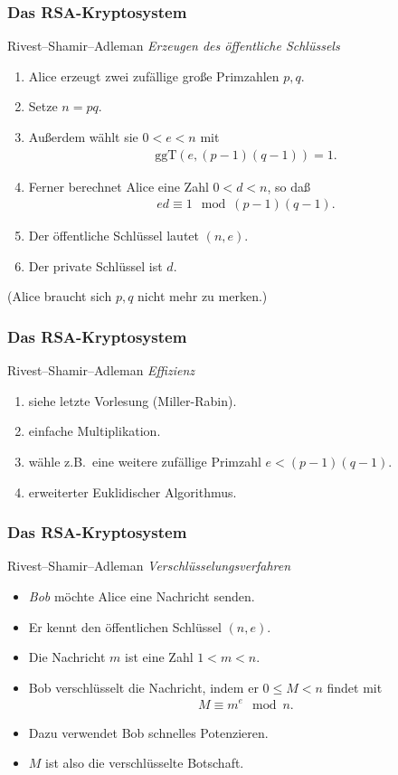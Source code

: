 \documentclass{beamer}
\renewcommand{\emph}[1]{{\textcolor{solarizedRed}{\itshape #1}}}
\newcommand{\ggt}{\mathrm{ggT}}
\renewcommand{\ae}{\"a}
\renewcommand{\oe}{\"o}
\newcommand{\ue}{\"u}
\newcommand{\mytitle}{Das RSA-Kryptosystem}
\begin{document}
\begin{frame}\frametitle{\mytitle}
	\begin{block}{Rivest--Shamir--Adleman}
		{\itshape Erzeugen des \oe ffentliche Schl\ue ssels}
		\begin{enumerate}
			\item \alert{Alice} erzeugt zwei zuf\ae llige gro\ss e Primzahlen $p,q$.
			\item Setze $n=pq$.
			\item Au\ss erdem w\ae hlt sie $0<e<n$ mit
				\begin{align*}
					\ggt(e,(p-1)(q-1))=1.
				\end{align*}
			\item Ferner berechnet Alice eine Zahl $0<d<n$, so da\ss\
				\begin{align*}
					ed\equiv1\mod(p-1)(q-1).
				\end{align*}
			\item Der \oe ffentliche Schl\ue ssel lautet $(n,e)$.
			\item Der private Schl\ue ssel ist $d$.
		\end{enumerate}
			(Alice braucht sich $p,q$ nicht mehr zu merken.)
	\end{block}
\end{frame}

\begin{frame}\frametitle{\mytitle}
	\begin{block}{Rivest--Shamir--Adleman}
		{\itshape Effizienz}
		\begin{enumerate}
			\item siehe letzte Vorlesung (Miller-Rabin).
			\item einfache Multiplikation.
			\item w\ae hle z.B.\ eine weitere zuf\ae llige Primzahl $e<(p-1)(q-1)$.
			\item erweiterter Euklidischer Algorithmus.
		\end{enumerate}
	\end{block}
\end{frame}

\begin{frame}\frametitle{\mytitle}
	\begin{block}{Rivest--Shamir--Adleman}
		{\itshape Verschl\ue sselungsverfahren}
		\begin{itemize}
			\item \emph{Bob} m\oe chte Alice eine Nachricht senden.
			\item Er kennt den \oe ffentlichen Schl\ue ssel $(n,e)$.
			\item Die Nachricht $m$ ist eine Zahl $1<m<n$.
			\item Bob verschl\ue sselt die Nachricht, indem er $0\leq M<n$ findet mit
				\begin{align*}
				M\equiv m^e\mod n.
				\end{align*}
			\item Dazu verwendet Bob schnelles Potenzieren.
			\item $M$ ist also die verschl\ue sselte Botschaft.
		\end{itemize}
	\end{block}
\end{frame}
\end{document}
